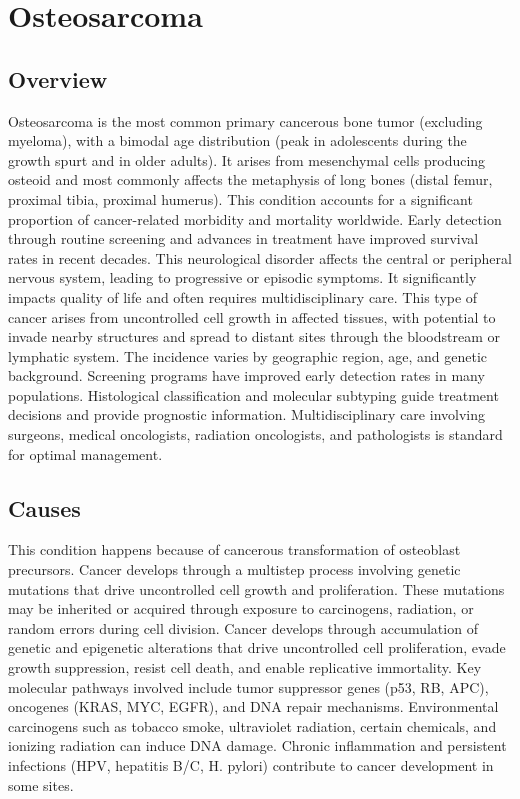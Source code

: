 \chapter{Osteosarcoma}
\label{sec:Osteosarcoma}

\section{Overview}
Osteosarcoma is the most common primary cancerous bone tumor (excluding myeloma), with a bimodal age distribution (peak in adolescents during the growth spurt and in older adults). It arises from mesenchymal cells producing osteoid and most commonly affects the metaphysis of long bones (distal femur, proximal tibia, proximal humerus). This condition accounts for a significant proportion of cancer-related morbidity and mortality worldwide. Early detection through routine screening and advances in treatment have improved survival rates in recent decades. This neurological disorder affects the central or peripheral nervous system, leading to progressive or episodic symptoms. It significantly impacts quality of life and often requires multidisciplinary care. This type of cancer arises from uncontrolled cell growth in affected tissues, with potential to invade nearby structures and spread to distant sites through the bloodstream or lymphatic system. The incidence varies by geographic region, age, and genetic background. Screening programs have improved early detection rates in many populations. Histological classification and molecular subtyping guide treatment decisions and provide prognostic information. Multidisciplinary care involving surgeons, medical oncologists, radiation oncologists, and pathologists is standard for optimal management.
\section{Causes}
This condition happens because of cancerous transformation of osteoblast precursors. Cancer develops through a multistep process involving genetic mutations that drive uncontrolled cell growth and proliferation. These mutations may be inherited or acquired through exposure to carcinogens, radiation, or random errors during cell division.   Cancer develops through accumulation of genetic and epigenetic alterations that drive uncontrolled cell proliferation, evade growth suppression, resist cell death, and enable replicative immortality. Key molecular pathways involved include tumor suppressor genes (p53, RB, APC), oncogenes (KRAS, MYC, EGFR), and DNA repair mechanisms. Environmental carcinogens such as tobacco smoke, ultraviolet radiation, certain chemicals, and ionizing radiation can induce DNA damage. Chronic inflammation and persistent infections (HPV, hepatitis B/C, H. pylori) contribute to cancer development in some sites.
